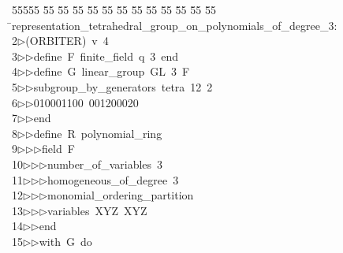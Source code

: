 %
%
\begin{tabbing}
55555 \= 55 \= 55 \= 55 \= 55 \= 55 \= 55 \= 55 \= 55 \= 55 \= 55 \= 55 \= 55 \= \>representation\_tetrahedral\_group\_on\_polynomials\_of\_degree\_3:\\[0pt]
2\>$\triangleright$\>(ORBITER)\ v\ 4\ \\[0pt]
3\>$\triangleright$\>$\triangleright$\>define\ F\ finite\_field\ q\ 3\ end\ \\[0pt]
4\>$\triangleright$\>$\triangleright$\>define\ G\ linear\_group\ GL\ 3\ F\ \\[0pt]
5\>$\triangleright$\>$\triangleright$\>subgroup\_by\_generators\ tetra\ 12\ 2\ \\[0pt]
6\>$\triangleright$\>$\triangleright$\>010001100\ 001200020\ \\[0pt]
7\>$\triangleright$\>$\triangleright$\>end\ \\[0pt]
8\>$\triangleright$\>$\triangleright$\>define\ R\ polynomial\_ring\ \\[0pt]
9\>$\triangleright$\>$\triangleright$\>$\triangleright$\>field\ F\ \\[0pt]
10\>$\triangleright$\>$\triangleright$\>$\triangleright$\>number\_of\_variables\ 3\ \\[0pt]
11\>$\triangleright$\>$\triangleright$\>$\triangleright$\>homogeneous\_of\_degree\ 3\ \\[0pt]
12\>$\triangleright$\>$\triangleright$\>$\triangleright$\>monomial\_ordering\_partition\ \\[0pt]
13\>$\triangleright$\>$\triangleright$\>$\triangleright$\>variables\ XYZ\ XYZ\ \\[0pt]
14\>$\triangleright$\>$\triangleright$\>end\ \\[0pt]
15\>$\triangleright$\>$\triangleright$\>with\ G\ do\ \\[0pt]

\end{tabbing}

